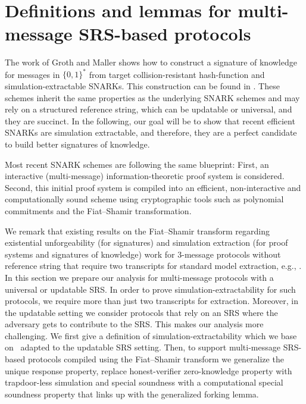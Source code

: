 \section{Definitions and lemmas for multi-message SRS-based protocols}
\label{sec:se_definitions}


   The work of Groth and Maller
\cite{C:GroMal17} shows how to construct a signature of knowledge for messages in
$\{0, 1\}^*$ from target collision-resistant hash-function and simulation-extractable
SNARKs. This construction can be found in .
These schemes inherit the same properties as the underlying SNARK schemes and
may rely on a structured reference string, which can be updatable or universal, and they are
succinct.  In the following, our goal will be to show that recent efficient SNARKs are
simulation extractable, and therefore, they are a perfect candidate to build better
signatures of knowledge.

  Most recent SNARK schemes
are following the same blueprint: First, an interactive (multi-message)
information-theoretic proof system is considered.
Second, this initial proof system is compiled into an efficient, non-interactive and
computationally sound scheme using cryptographic tools such as polynomial commitments
and the Fiat--Shamir transformation.

We remark that existing results on the Fiat--Shamir transform regarding existential
unforgeability (for signatures) and simulation extraction (for proof systems and
signatures of knowledge) work for $3$-message protocols without reference string that
require two transcripts for standard model extraction, e.g.,
\cite{JC:PoiSte00,INDOCRYPT:FKMV12,C:RotSeg21}.  In this section we prepare our
analysis for multi-message protocols with a universal or updatable SRS.  In order to
prove simulation-extractability for such protocols, we require more than just two
transcripts for extraction.  Moreover, in the updatable setting we consider protocols
that rely on an SRS where the adversary gets to contribute to the SRS. This makes our
analysis more challenging.  We first give a definition of simulation-extractability
which we base on~\cite{INDOCRYPT:FKMV12} adapted to the updatable SRS setting. Then,
to support multi-message SRS-based protocols compiled using the Fiat--Shamir transform
we generalize the unique response property, replace honest-verifier zero-knowledge
property with trapdoor-less simulation and special soundness with a computational special
soundness property that links up with the generalized forking lemma.

